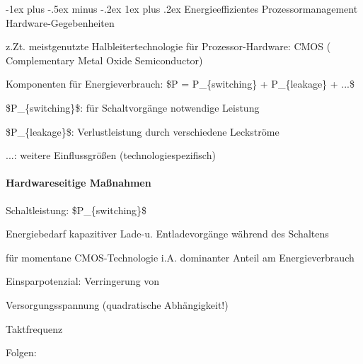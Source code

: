 \documentclass[a4paper]{article}
\makeatletter
\renewcommand{\subsubsection}{\@startsection{subsubsection}{3}{0mm}%
 {-1ex plus -.5ex minus -.2ex}%
 {1ex plus .2ex}%
 {\normalfont\small\bfseries}}
\makeatother
\begin{document}
\begin{multicols}{3}
    \subsubsection{Energieeffizientes Prozessormanagement}
    Hardware-Gegebenheiten
    \begin{itemize*}
        \item z.Zt. meistgenutzte Halbleitertechnologie für Prozessor-Hardware: CMOS
        ( Complementary Metal Oxide Semiconductor)
        \item
        Komponenten für Energieverbrauch: \$P = P\_\{switching\} +
        P\_\{leakage\} + ...\$
        \begin{itemize*}
            \item \$P\_\{switching\}\$: für Schaltvorgänge notwendige Leistung
            \item \$P\_\{leakage\}\$: Verlustleistung durch verschiedene Leckströme
            \item ...: weitere Einflussgrößen (technologiespezifisch)
        \end{itemize*}
    \end{itemize*}


    \paragraph{Hardwareseitige
        Maßnahmen}

    Schaltleistung: \$P\_\{switching\}\$

    \begin{itemize*}
        \item
        Energiebedarf kapazitiver Lade-u. Entladevorgänge während des
        Schaltens
        \item
        für momentane CMOS-Technologie i.A. dominanter Anteil am
        Energieverbrauch
        \item
        Einsparpotenzial: Verringerung von
        \begin{enumerate*}

            \item Versorgungsspannung (quadratische Abhängigkeit!)
            \item Taktfrequenz
        \end{enumerate*}
        \item
        Folgen:
        \begin{enumerate*}


\end{enumerate*}
\end{itemize*}
\end{multicols}
\end{document}
